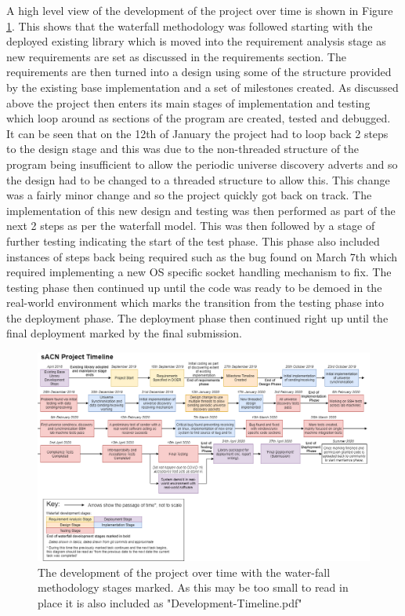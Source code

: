 \documentclass[11pt,a4paper]{article}
\begin{document}
A high level view of the development of the project over time is shown in Figure \ref{project_dev_timeline}. This shows that the waterfall methodology was followed starting with the deployed existing library which is moved into the requirement analysis stage as new requirements are set as discussed in the requirements section. The requirements are then turned into a design using some of the structure provided by the existing base implementation and a set of milestones created. As discussed above the project then enters its main stages of implementation and testing which loop around as sections of the program are created, tested and debugged. It can be seen that on the 12th of January the project had to loop back 2 steps to the design stage and this was due to the non-threaded structure of the program being insufficient to allow the periodic universe discovery adverts and so the design had to be changed to a threaded structure to allow this. This change was a fairly minor change and so the project quickly got back on track. The implementation of this new design and testing was then performed as part of the next 2 steps as per the waterfall model. This was then followed by a stage of further testing indicating the start of the test phase. This phase also included instances of steps back being required such as the bug found on March 7th which required implementing a new OS specific socket handling mechanism to fix. The testing phase then continued up until the code was ready to be demoed in the real-world environment which marks the transition from the testing phase into the deployment phase. The deployment phase then continued right up until the final deployment marked by the final submission.\\

\begin{figure}[H]
\label{project_dev_timeline}
\includegraphics[width=\textwidth]{CS4099-dev-timeline}
\caption{The development of the project over time with the water-fall methodology stages marked. As this may be too small to read in place it is also included as "Development-Timeline.pdf"}
\end{figure}
\end{document}
